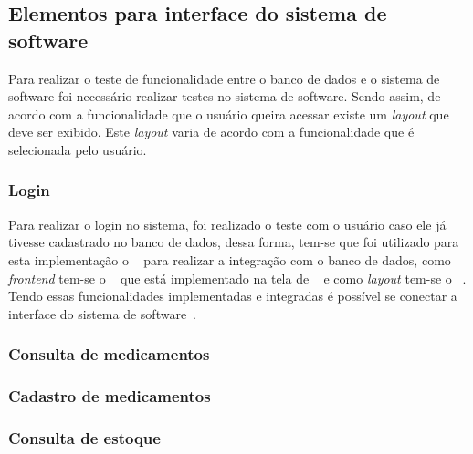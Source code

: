 %



\subsection{Elementos para interface do sistema de software}

Para realizar o teste de funcionalidade entre o banco de dados e o sistema de software foi necessário realizar testes no sistema de software. Sendo assim, de acordo com a funcionalidade que o usuário queira acessar existe um \emph{layout} que deve ser exibido. Este \emph{layout} varia de acordo com a funcionalidade que é selecionada pelo usuário.

\subsubsection{Login}

Para realizar o login no sistema, foi realizado o teste com o usuário caso ele já tivesse cadastrado no banco de dados, dessa forma, tem-se que foi utilizado para esta implementação o ~ para realizar a integração com o banco de dados, como \emph{frontend} tem-se o ~ que está implementado na tela de ~ e como \emph{layout} tem-se o ~. Tendo essas funcionalidades implementadas e integradas é possível se conectar a interface do sistema de software~.

%


%

\subsubsection{Consulta de medicamentos}

\subsubsection{Cadastro de medicamentos}

\subsubsection{Consulta de estoque}



